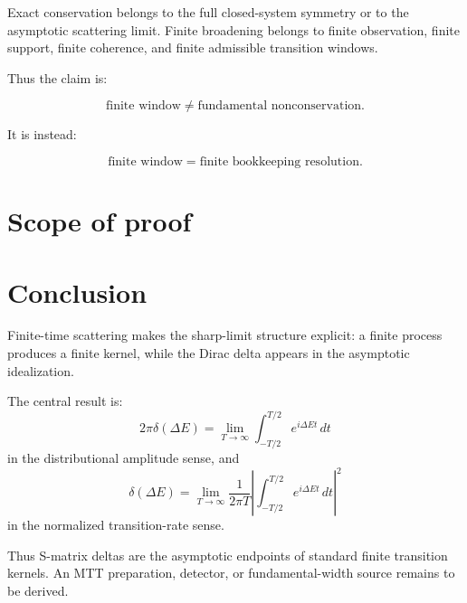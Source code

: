 \documentclass[11pt]{article}
\begin{document}
Exact conservation belongs to the full closed-system symmetry or to the asymptotic scattering limit.  Finite broadening belongs to finite observation, finite support, finite coherence, and finite admissible transition windows.

Thus the claim is:

\[
\text{finite window} \neq \text{fundamental nonconservation}.
\]

It is instead:

\[
\text{finite window} = \text{finite bookkeeping resolution}.
\]

\section{Scope of proof}

\begin{center}
\end{center}

\section{Conclusion}
\enlargethispage{2\baselineskip}

Finite-time scattering makes the sharp-limit structure explicit: a finite process produces a
finite kernel, while the Dirac delta appears in the asymptotic idealization.

The central result is:
\[
\boxed{
2\pi\delta(\Delta E)
=
\lim_{T\to\infty}
\int_{-T/2}^{T/2}e^{i\Delta E t}\,dt
}
\]
in the distributional amplitude sense, and
\[
\boxed{
\delta(\Delta E)
=
\lim_{T\to\infty}
\frac{1}{2\pi T}\left|
\int_{-T/2}^{T/2}e^{i\Delta E t}\,dt
\right|^2
}
\]
in the normalized transition-rate sense.

Thus S-matrix deltas are the asymptotic endpoints of standard finite transition kernels.  An
MTT preparation, detector, or fundamental-width source remains to be derived.
\end{document}
